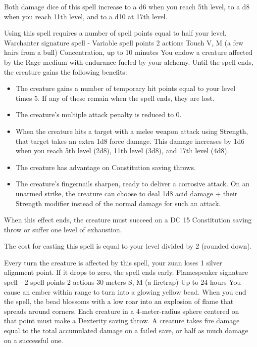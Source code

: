     Both damage dice of this spell increase to a d6 when you reach 5th level, to a d8 when you reach 11th level, and to a d10 at 17th level.

    Using this spell requires a number of spell points equal to half your level.
    {Warchanter signature spell - Variable spell points}
    {2 actions}
    {Touch}
    {V, M (a few hairs from a bull)}
    {Concentration, up to 10 minutes}
    You endow a creature affected by the Rage medium with endurance fueled by your alchemy.
    Until the spell ends, the creature gains the following benefits:

    \begin{itemize}
        \item The creature gains a number of temporary hit points equal to your level times 5.
        If any of these remain when the spell ends, they are lost.
        \item The creature's multiple attack penalty is reduced to 0.
        \item When the creature hits a target with a melee weapon attack using Strength, that target takes an extra 1d8 force damage.
        This damage increases by 1d6 when you reach 5th level (2d8), 11th level (3d8), and 17th level (4d8).
        \item The creature has advantage on Constitution saving throws.
        \item The creature's fingernails sharpen, ready to deliver a corrosive attack.
        On an unarmed strike, the creature can choose to deal 1d8 acid damage + their Strength modifier instead of the normal damage for such an attack.
    \end{itemize}

    When this effect ends, the creature must succeed on a DC 15 Constitution saving throw or suffer one level of exhaustion.

    The cost for casting this spell is equal to your level divided by 2 (rounded down).

    Every turn the creature is affected by this spell, your zuan loses 1 silver alignment point.
    If it drops to zero, the spell ends early.
    {Flamespeaker signature spell - 2 spell points}
    {2 actions}
    {30 meters}
    {S, M (a firetrap)}
    {Up to 24 hours}
    You cause an ember within range to turn into a glowing yellow bead.
    When you end the spell, the bead blossoms with a low roar into an explosion of flame that spreads around corners.
    Each creature in a 4-meter-radius sphere centered on that point must make a Dexterity saving throw.
    A creature takes fire damage equal to the total accumulated damage on a failed save, or half as much damage on a successful one.

